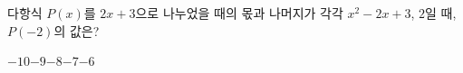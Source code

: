 다항식 $P(x)$를 $2x+3$으로 나누었을 때의 몫과 나머지가 각각 $x^2-2x+3$, $2$일 때, $P(-2)$의 값은?
\begin{choices32}{$-10$}{$-9$}{$-8$}{$-7$}{$-6$}\end{choices32}
